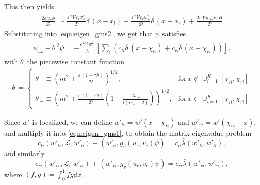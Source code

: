 \documentclass[a4paper,10pt]{article}
\newcommand{\dE}{\ensuremath{\delta\,}}
\newcommand{\tH}{\ensuremath{\theta\,}}
\newcommand{\lA}{\ensuremath{\lambda}}
\newcommand{\Ep}{\ensuremath{\varepsilon\,}}
\newcommand{\DD}{\ensuremath{\mathcal{D}}}
\newcommand{\VV}{\ensuremath{\mathcal{V}}}
\newcommand{\LL}{\ensuremath{\mathcal{L}}}
\begin{document}
This then yields
% 
\begin{equation}
\label{eqn:phi_main}
\begin{split}
\begin{aligned}
\frac{2\Ep u_e\phi}{\DD}&\sim \frac{\Ep^2\VV c_lw_+^2}{\DD}\dE(x-x_l) +\frac{\Ep^2\VV c_rw_+^2}{\DD}\dE(x-x_r) + \frac{2\Ep\VV w_+\mu\psi H}{\DD}
\end{aligned}
\end{split}
\end{equation}
% 
Substituting into \eqref{eqn:eigen_gms2}, we get that $\psi$ satisfies
% 
\begin{equation}
\label{eqn:phi_main2}
\begin{split}
\begin{aligned}
\psi_{xx}-\tH^2\psi = -\frac{\Ep^2\VV w_+^2}{\DD}\left[\sum_i(c_{li}\dE(x-\chi_{li}) + c_{ri}\dE(x-\chi_{ri})) \right],
\end{aligned}
\end{split}
\end{equation}
% 
with $\tH$ the piecewise constant function
% 
\begin{equation}
\label{eqn:phi_asym}
	\begin{split}
	\tH
   = \left\{
	\begin{matrix}
		\tH_-\equiv\left(m^2+\frac{\Ep(1+\tau\lA)}{\DD}\right)^{1/2},& \mathrm{for}\hspace{2pt} x\notin\cup_{i=1}^K[\chi_{li},\chi_{ri}]\\
		\tH_+\equiv\left(m^2+\frac{\Ep(1+\tau\lA)}{\DD}\left(1+\frac{2w_+}{l(w_+-2)} \right)\right)^{1/2},& \mathrm{for}\hspace{2pt} x\in\cup_{i=1}^K[\chi_{li},\chi_{ri}]
	\end{matrix}\right.
	\end{split}
\end{equation}
% 

Since $w'$ is localized, we can define $w'_{li}=w'(x-\chi_{li})$ and $w'_{ri}=w'(\chi_{ri}-x)$, and multiply it into \eqref{eqn:eigen_gms1}, to obtain the matrix eigenvalue problem
% 
\begin{equation}
\label{eqn:matrix_eigen_l}
  c_{li}(w'_{li},\LL_{\Ep}w'_{li}) + (w'_{li},g_v(u_e,v_e)\psi) = c_{li}\bar{\lA}(w'_{li},w'_{li}),
\end{equation}
% 
and similarly
% 
\begin{equation}
\label{eqn:matrix_eigen_r}
  c_{ri}(w'_{ri},\LL_{\Ep}w'_{ri}) + (w'_{ri},g_v(u_e,v_e)\psi) = c_{ri}\bar{\lA}(w'_{ri},w'_{ri}),
\end{equation}
% 
where $(f,g) = \int_0^1fgdx$.
\end{document}

